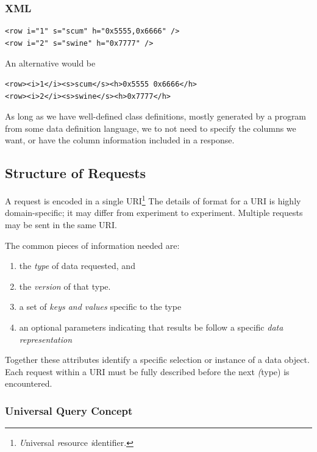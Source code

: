 \subsubsection{XML}
\begin{verbatim}
<row i="1" s="scum" h="0x5555,0x6666" />
<row i="2" s="swine" h="0x7777" />
\end{verbatim}

An alternative would be
\begin{verbatim}
<row><i>1</i><s>scum</s><h>0x5555 0x6666</h>
<row><i>2</i><s>swine</s><h>0x7777</h>
\end{verbatim}

As long as we have well-defined class definitions, mostly generated by
a program from some data definition language, we to not need to specify
the columns we want, or have the column information included in a 
response.

\subsection{Structure of Requests}

A request is encoded in a single URI\footnote{\textit{U}niversal
\textit{r}esource \textit{i}dentifier.} The details of format for a URI
is highly domain-specific; it may differ from experiment to experiment.
Multiple requests may be sent in the same URI.

The common pieces of information needed are:

\begin{enumerate}
\item the \emph{type} of data requested, and
\item the \emph{version} of that type.
\item a set of \emph{keys and values} specific to the type
\item an optional parameters indicating that results be
follow a specific \emph{data representation}
\end{enumerate}

Together these attributes identify a specific selection or instance
of a data object.  Each request within a URI must be fully described
before the next \emph(type) is encountered.

\subsubsection{Universal Query Concept}

